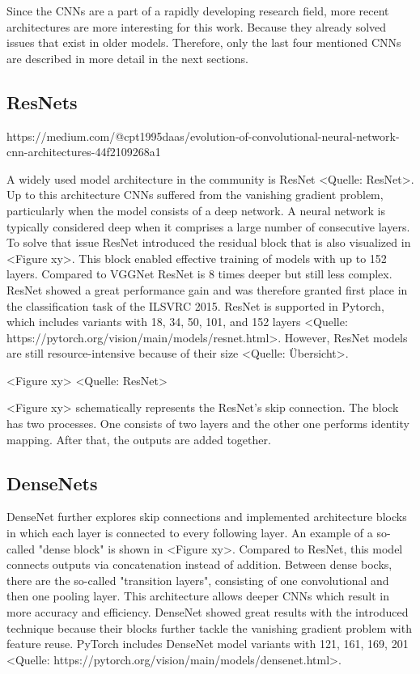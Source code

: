 \vspace{1cm} %

\noindent Since the CNNs are a part of a rapidly developing research field, more recent architectures are more interesting for this work.
Because they already solved issues that exist in older models.
Therefore, only the last four mentioned CNNs are described in more detail in the next sections.

\subsection{ResNets}

https://medium.com/@cpt1995daas/evolution-of-convolutional-neural-network-cnn-architectures-44f2109268a1

A widely used model architecture in the community is ResNet <Quelle: ResNet>.
Up to this architecture CNNs suffered from the vanishing gradient problem, particularly when the model consists of a deep network.
A neural network is typically considered deep when it comprises a large number of consecutive layers.
To solve that issue ResNet introduced the residual block that is also visualized in <Figure xy>.
This block enabled effective training of models with up to 152 layers. Compared to VGGNet ResNet is 8 times deeper but still less complex.
ResNet showed a great performance gain and was therefore granted first place in the classification task of the ILSVRC 2015.
ResNet is supported in Pytorch, which includes variants with 18, 34, 50, 101, and 152 layers <Quelle: https://pytorch.org/vision/main/models/resnet.html>. 
However, ResNet models are still resource-intensive because of their size <Quelle: Übersicht>. 

\vspace{1cm}

<Figure xy> <Quelle: ResNet>

\vspace{1cm}

<Figure xy> schematically represents the ResNet's skip connection.
The block has two processes.
One consists of two layers and the other one performs identity mapping.
After that, the outputs are added together.

\subsection{DenseNets}

DenseNet further explores skip connections and implemented architecture blocks in which each layer is connected to every following layer.
An example of a so-called "dense block" is shown in <Figure xy>.
Compared to ResNet, this model connects outputs via concatenation instead of addition.
Between dense bocks, there are the so-called "transition layers", consisting of one convolutional and then one pooling layer.
This architecture allows deeper CNNs which result in more accuracy and efficiency.
DenseNet showed great results with the introduced technique because their blocks further tackle the vanishing gradient problem with feature reuse.
PyTorch includes DenseNet model variants with 121, 161, 169, 201 <Quelle: https://pytorch.org/vision/main/models/densenet.html>.

